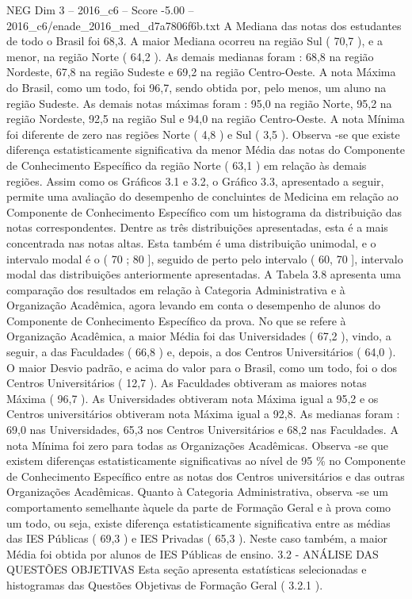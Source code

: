 \begin{textsample}{NEG Dim 3 – 2016\_c6 – Score -5.00 – 2016\_c6/enade\_2016\_med\_d7a7806f6b.txt}
A Mediana das notas dos estudantes de todo o Brasil foi 68,3.
A maior Mediana ocorreu na região Sul ( 70,7 ), e a menor, na região Norte ( 64,2 ).
As demais medianas foram : 68,8 na região Nordeste, 67,8 na região Sudeste e 69,2 na região Centro-Oeste.
A nota Máxima do Brasil, como um todo, foi 96,7, sendo obtida por, pelo menos, um aluno na região Sudeste.
As demais notas máximas foram : 95,0 na região Norte, 95,2 na região Nordeste, 92,5 na região Sul e 94,0 na região Centro-Oeste.
A nota Mínima foi diferente de zero nas regiões Norte ( 4,8 ) e Sul ( 3,5 ).
Observa -se que existe diferença estatisticamente significativa da menor Média das notas do Componente de Conhecimento Específico da região Norte ( 63,1 ) em relação às demais regiões.
Assim como os Gráficos 3.1 e 3.2, o Gráfico 3.3, apresentado a seguir, permite uma avaliação do desempenho de concluintes de Medicina em relação ao Componente de Conhecimento Específico com um histograma da distribuição das notas correspondentes.
Dentre as três distribuições apresentadas, esta é a mais concentrada nas notas altas.
Esta também é uma distribuição unimodal, e o intervalo modal é o ( 70 ; 80 ], seguido de perto pelo intervalo ( 60, 70 ], intervalo modal das distribuições anteriormente apresentadas.
A Tabela 3.8 apresenta uma comparação dos resultados em relação à Categoria Administrativa e à Organização Acadêmica, agora levando em conta o desempenho de alunos do Componente de Conhecimento Específico da prova.
No que se refere à Organização Acadêmica, a maior Média foi das Universidades ( 67,2 ), vindo, a seguir, a das Faculdades ( 66,8 ) e, depois, a dos Centros Universitários ( 64,0 ).
O maior Desvio padrão, e acima do valor para o Brasil, como um todo, foi o dos Centros Universitários ( 12,7 ).
As Faculdades obtiveram as maiores notas Máxima ( 96,7 ).
As Universidades obtiveram nota Máxima igual a 95,2 e os Centros universitários obtiveram nota Máxima igual a 92,8.
As medianas foram : 69,0 nas Universidades, 65,3 nos Centros Universitários e 68,2 nas Faculdades.
A nota Mínima foi zero para todas as Organizações Acadêmicas.
Observa -se que existem diferenças estatisticamente significativas ao nível de 95 \% no Componente de Conhecimento Específico entre as notas dos Centros universitários e das outras Organizações Acadêmicas.
Quanto à Categoria Administrativa, observa -se um comportamento semelhante àquele da parte de Formação Geral e à prova como um todo, ou seja, existe diferença estatisticamente significativa entre as médias das IES Públicas ( 69,3 ) e IES Privadas ( 65,3 ).
Neste caso também, a maior Média foi obtida por alunos de IES Públicas de ensino. 3.2 - ANÁLISE DAS QUESTÕES OBJETIVAS Esta seção apresenta estatísticas selecionadas e histogramas das Questões Objetivas de Formação Geral ( 3.2.1 ).

\end{textsample}
